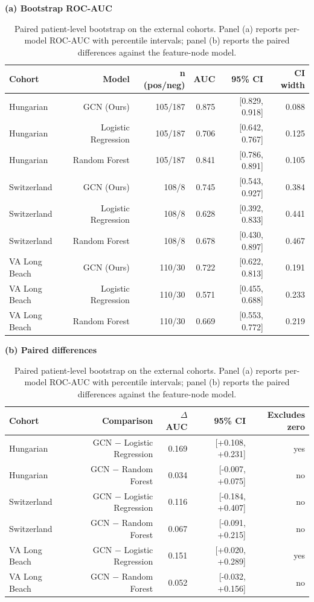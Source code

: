 \begin{table}[t]
\centering
\caption{Paired patient-level bootstrap on the external cohorts. Panel (a) reports per-model ROC-AUC with percentile intervals; panel (b) reports the paired differences against the feature-node model.}
\label{tab:extboot}
\label{tab:extbootdelta}
\footnotesize
\textbf{(a) Bootstrap ROC-AUC}\\[2pt]
\begin{tabular}{lrrrrr}
\toprule
Cohort & Model & n (pos/neg) & AUC & 95\% CI & CI width \\
\midrule
Hungarian & GCN (Ours) & 105/187 & 0.875 & [0.829, 0.918] & 0.088 \\
Hungarian & Logistic Regression & 105/187 & 0.706 & [0.642, 0.767] & 0.125 \\
Hungarian & Random Forest & 105/187 & 0.841 & [0.786, 0.891] & 0.105 \\
Switzerland & GCN (Ours) & 108/8 & 0.745 & [0.543, 0.927] & 0.384 \\
Switzerland & Logistic Regression & 108/8 & 0.628 & [0.392, 0.833] & 0.441 \\
Switzerland & Random Forest & 108/8 & 0.678 & [0.430, 0.897] & 0.467 \\
VA Long Beach & GCN (Ours) & 110/30 & 0.722 & [0.622, 0.813] & 0.191 \\
VA Long Beach & Logistic Regression & 110/30 & 0.571 & [0.455, 0.688] & 0.233 \\
VA Long Beach & Random Forest & 110/30 & 0.669 & [0.553, 0.772] & 0.219 \\
\bottomrule
\end{tabular}
\vspace{7pt}
\textbf{(b) Paired differences}\\[2pt]
\begin{tabular}{lrrrr}
\toprule
Cohort & Comparison & $\Delta$AUC & 95\% CI & Excludes zero \\
\midrule
Hungarian & GCN $-$ Logistic Regression & 0.169 & [+0.108, +0.231] & yes \\
Hungarian & GCN $-$ Random Forest & 0.034 & [-0.007, +0.075] & no \\
Switzerland & GCN $-$ Logistic Regression & 0.116 & [-0.184, +0.407] & no \\
Switzerland & GCN $-$ Random Forest & 0.067 & [-0.091, +0.215] & no \\
VA Long Beach & GCN $-$ Logistic Regression & 0.151 & [+0.020, +0.289] & yes \\
VA Long Beach & GCN $-$ Random Forest & 0.052 & [-0.032, +0.156] & no \\
\bottomrule
\end{tabular}
\end{table}
